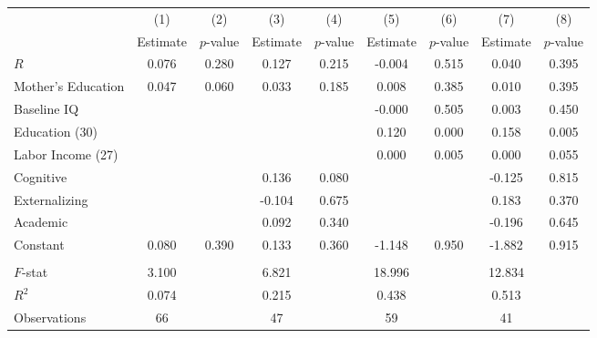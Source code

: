 \begin{tabular}{lcccccccc} \toprule
 & (1) & (2) & (3) & (4) & (5) & (6) & (7) & (8) \\ 
 & Estimate  & $p$-value  & Estimate  & $p$-value  & Estimate  & $p$-value  & Estimate  & $p$-value  \\  \midrule
$R$ &     0.076 &     0.280 &     0.127 &     0.215 &    -0.004 &     0.515 &     0.040 &     0.395 \\  
Mother's Education &     0.047 &     0.060 &     0.033 &     0.185 &     0.008 &     0.385 &     0.010 &     0.395 \\  
Baseline IQ &         &         &         &         &    -0.000 &     0.505 &     0.003 &     0.450 \\  
Education (30) &         &         &         &         &     0.120 &     0.000 &     0.158 &     0.005 \\  
Labor Income (27) &         &         &         &         &     0.000 &     0.005 &     0.000 &     0.055 \\  
Cognitive &         &         &     0.136 &     0.080 &         &         &    -0.125 &     0.815 \\  
Externalizing &         &         &    -0.104 &     0.675 &         &         &     0.183 &     0.370 \\  
Academic &         &         &     0.092 &     0.340 &         &         &    -0.196 &     0.645 \\  
Constant &     0.080 &     0.390 &     0.133 &     0.360 &    -1.148 &     0.950 &    -1.882 &     0.915 \\  \\ \midrule
$F$-stat &     3.100 &         &     6.821 &         &    18.996 &         &    12.834 &         \\  
$R^2$ &     0.074 &         &     0.215 &         &     0.438 &         &     0.513 &         \\  
Observations &    66 &         &    47 &         &    59 &         &    41 &         \\  
\bottomrule
\end{tabular}

